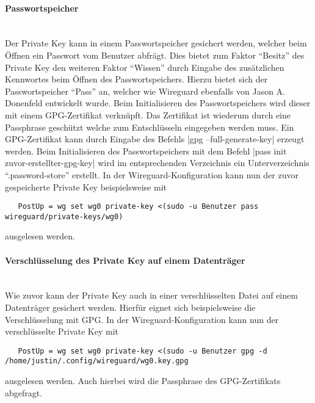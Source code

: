\paragraph{Passwortspeicher} 
\noindent \\Der Private Key kann in einem Passwortspeicher gesichert werden, welcher beim \"Offnen ein Passwort vom Benutzer abfr\"agt. Dies bietet zum Faktor "`Besitz"' des Private Key den weiteren Faktor "`Wissen"' durch Eingabe des zus\"atzlichen Kennwortes beim \"Offnen des Passwortspeichers. Hierzu bietet sich der Passwortspeicher "`Pass"' an, welcher wie Wireguard ebenfalls von Jason A. Donenfeld entwickelt wurde. Beim Initialisieren des Passwortspeichers wird dieser mit einem GPG-Zertifikat verknüpft. Das Zertifikat ist wiederum durch eine Passphrase gesch\"utzt welche zum Entschlüsseln eingegeben werden muss.
Ein GPG-Zertifikat kann durch Eingabe des Befehls |gpg --full-generate-key| erzeugt werden. Beim Initialisieren des Passwortspeichers mit dem Befehl |pass init zuvor-erstellter-gpg-key| wird im entsprechenden Verzeichnis ein Unterverzeichnis \enquote{.password-store} erstellt. In der Wireguard-Konfiguration kann nun der zuvor gespeicherte Private Key beispielsweise mit 
\begin{verbatim}
   PostUp = wg set wg0 private-key <(sudo -u Benutzer pass wireguard/private-keys/wg0)
\end{verbatim}
ausgelesen werden.

\paragraph{Verschl\"usselung des Private Key auf einem Datentr\"ager}
\noindent \\Wie zuvor kann der Private Key auch in einer verschl\"usselten Datei auf einem Datentr\"ager gesichert werden. Hierfür eignet sich beispielsweise die Verschl\"usselung mit GPG. In der Wireguard-Konfiguration kann nun der verschl\"usselte Private Key mit 
\begin{verbatim}
   PostUp = wg set wg0 private-key <(sudo -u Benutzer gpg -d /home/justin/.config/wireguard/wg0.key.gpg
\end{verbatim}
ausgelesen werden. Auch hierbei wird die Passphrase des GPG-Zertifikats abgefragt. 

